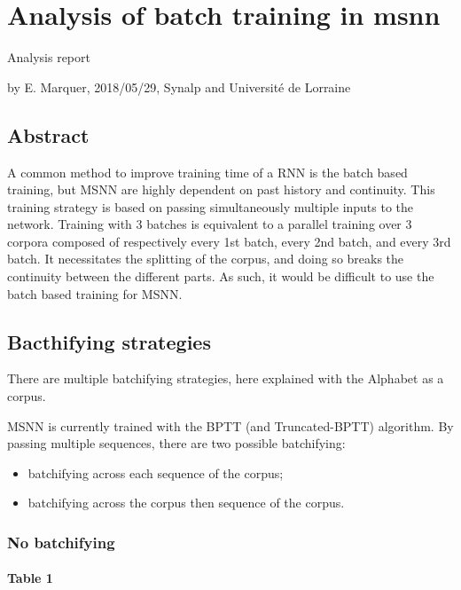 \section*{Analysis of batch training in msnn}

Analysis report

by E. Marquer, 2018/05/29, Synalp and Université de Lorraine

\subsection{Abstract}

A common method to improve training time of a RNN is the batch based
training, but MSNN are highly dependent on past history and continuity.
This training strategy is based on passing simultaneously multiple
inputs to the network. Training with 3 batches is equivalent to a
parallel training over 3 corpora composed of respectively every 1st batch,
every 2nd batch, and every 3rd batch. It necessitates the splitting of
the corpus, and doing so breaks the continuity between the different
parts. As such, it would be difficult to use the batch based training
for MSNN.

\subsection{Bacthifying strategies}\label{bacthifying-strategies}

There are multiple batchifying strategies, here explained with the
Alphabet as a corpus.

MSNN is currently trained with the BPTT (and Truncated-BPTT) algorithm.
By passing multiple sequences, there are two possible batchifying: 
\begin{itemize}
	\item batchifying across each sequence of the corpus;
	\item batchifying across the
	corpus then sequence of the corpus.
\end{itemize}

\subsubsection{No batchifying}\label{table 1}

\paragraph{Table 1}

